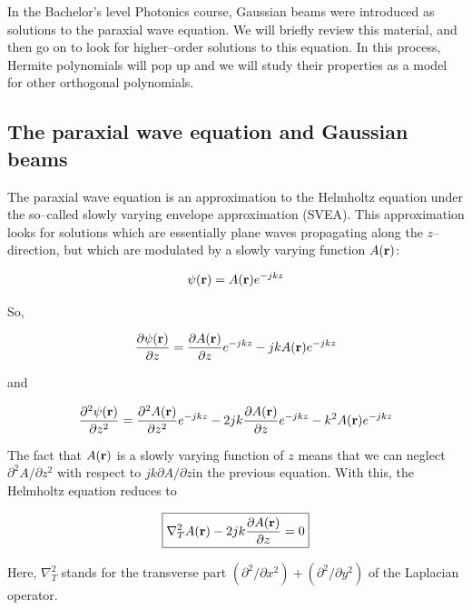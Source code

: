 In the Bachelor's level Photonics course, Gaussian beams were introduced as solutions to the paraxial wave equation. We will briefly review this material, and then go on to look for higher--order solutions to this equation. In this process, Hermite polynomials will pop up and we will study their properties as a model for other orthogonal polynomials.

\subsection{The paraxial wave equation and Gaussian beams}

The paraxial wave equation is an approximation to the Helmholtz equation under the so--called slowly varying envelope approximation (SVEA). This approximation looks for solutions which are essentially plane waves propagating along the $z$--direction, but which are modulated by a slowly varying function $A({\bf r})$:

\begin{equation}
\psi({\bf r}) = A({\bf r})e^{-jkz}
\end{equation} 

So,

\begin{equation}
\frac{\partial \psi({\bf r})}{\partial z} = \frac {\partial A({\bf r})}{\partial z}e^{-jkz} -j k A({\bf r})e^{-jkz}
\end{equation} 

and

\begin{equation}
\frac{\partial^2 \psi({\bf r})}{\partial z^2} = \frac{\partial^2 A({\bf r})}{\partial z^2}e^{-jkz} - 2 j k \frac{\partial A({\bf r})}{\partial z}e^{-jkz} - k^2 A({\bf r})e^{-jkz}
\end{equation} 

The fact that $A({\bf r})$ is a slowly varying function of $z$ means that we can neglect $\partial^2 A / \partial z^2$ with respect to $j k \partial A / \partial z$in the previous equation. With this, the Helmholtz equation reduces to

\begin{equation}
\fbox{$\displaystyle
\nabla_T^2 A({\bf r}) -2jk \frac{\partial A({\bf r})}{\partial z} = 0
$}
\label{eq-paraxial}
\end{equation} 

Here, $\nabla_T^2$ stands for the transverse part $(\partial^2 / \partial x^2) + (\partial^2 / \partial y^2)$ of the Laplacian operator.


